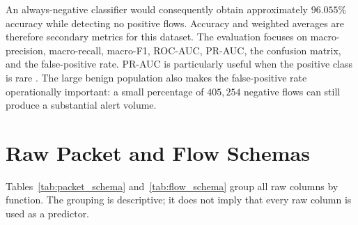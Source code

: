 \documentclass[11pt,fleqn]{report}
\begin{document}
An always-negative classifier would consequently obtain approximately
$96.055\%$ accuracy while detecting no positive flows. Accuracy and weighted
averages are therefore secondary metrics for this dataset. The evaluation
focuses on macro-precision, macro-recall, macro-F1, ROC-AUC, PR-AUC, the
confusion matrix, and the false-positive rate. PR-AUC is particularly useful
when the positive class is rare \cite{SaitoRehmsmeier2015}. The large benign
population also makes the false-positive rate operationally important: a small
percentage of $405{,}254$ negative flows can still produce a substantial alert
volume.

\section{Raw Packet and Flow Schemas}
\label{subsec:raw_schemas}

Tables~\ref{tab:packet_schema} and~\ref{tab:flow_schema} group all raw columns
by function. The grouping is descriptive; it does not imply that every raw
column is used as a predictor.
\end{document}
